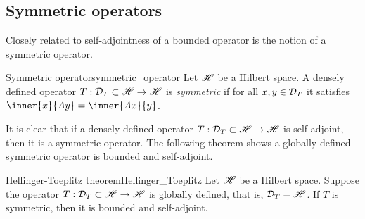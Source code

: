 \subsection{Symmetric operators}
Closely related to self-adjointness of a bounded operator is the notion of a symmetric operator.
\begin{definition}{Symmetric operator}{symmetric_operator}
    Let \(\mathscr{H}\) be a Hilbert space. A densely defined operator \(T : \mathcal{D}_{T} \subset \mathscr{H} \to \mathscr{H}\) is \emph{symmetric} if for all \(x, y \in \mathcal{D}_{T}\) it satisfies \(\inner{x}{Ay} = \inner{Ax}{y}\).
\end{definition}
It is clear that if a densely defined operator \(T : \mathcal{D}_{T} \subset \mathscr{H} \to \mathscr{H}\) is self-adjoint, then it is a symmetric operator. The following theorem shows a globally defined symmetric operator is bounded and self-adjoint.
\begin{theorem}{Hellinger-Toeplitz theorem}{Hellinger_Toeplitz}
    Let \(\mathscr{H}\) be a Hilbert space. Suppose the operator \(T : \mathcal{D}_{T} \subset \mathscr{H} \to \mathscr{H}\) is globally defined, that is, \(\mathcal{D}_{T} = \mathscr{H}\). If \(T\) is symmetric, then it is bounded and self-adjoint.
\end{theorem}
